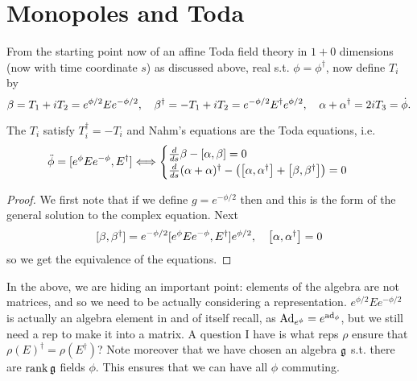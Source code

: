 \documentclass{article}
\begin{document}
\section{Monopoles and Toda}
From the starting point now of an affine Toda field theory in $1+0$ dimensions (now with time coordinate $s$) as discussed above, real s.t. $\phi=\phi^\dagger$, now define $T_i$ by 
$$
\beta=T_1+i T_2=e^{\phi/2} E e^{-\phi/2},\quad
\beta\sp\dagger=-T_1+i T_2=e^{-\phi/2} E\sp\dagger e^{\phi/2},\quad
\alpha+\alpha\sp\dagger=2i T_3 =\dot \phi.
$$

\begin{prop}
	The $T_i$ satisfy $T_i^\dagger = -T_i$ and Nahm's equations are the Toda equations, i.e.
\begin{align*}
\def\arraystretch{3.2}
\ddot\phi&=[ e^{\phi}E  e^{-\phi} ,E\sp\dagger ] 
\Longleftrightarrow  \begin{cases}
\frac{d}{ds}\beta - \comm[\alpha]{\beta} = 0 \\
\frac{d}{ds}(\alpha + \alpha)^\dagger - \pround{\comm[\alpha]{\alpha^\dagger} + \comm[\beta]{\beta^\dagger}} = 0
\end{cases}
\end{align*}
\end{prop}
\begin{proof}
We first note that if we define $g = e^{-\phi/2}$ then 
and this is the form of the general solution to the complex equation. Next 
	$$[\beta, \beta\sp\dagger]=e^{-\phi/2}[ e^{\phi}E  e^{-\phi} ,E\sp\dagger ]  e^{\phi/2}, \quad \comm[\alpha]{\alpha^\dagger}=0
	$$
so we get the equivalence of the equations. 
\end{proof}

\begin{remark}
	In the above, we are hiding an important point: elements of the algebra are not matrices, and so we need to be actually considering a representation. $e^{\phi/2}Ee^{-\phi/2}$ is actually an algebra element in and of itself recall, as $\Ad_{e^{\phi}} = e^{\ad_\phi}$, but we still need a rep to make it into a matrix. A question I have is what reps $\rho$ ensure that $\rho(E)^\dagger = \rho(E^\dagger)$? Note moreover that we have chosen an algebra $\mf{g}$ s.t. there are $\rank \mf{g}$ fields $\phi$. This ensures that we can have all $\phi$ commuting.  
\end{remark}
\end{document}
